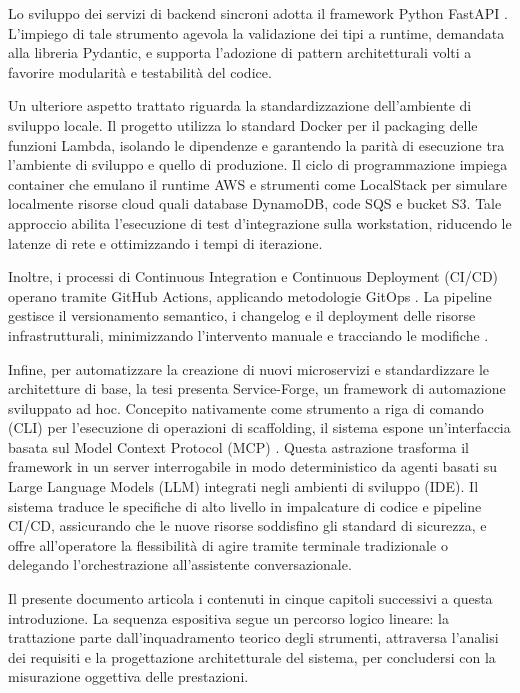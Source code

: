 Lo sviluppo dei servizi di backend sincroni adotta il framework Python FastAPI \cite{FastAPIDoc}. L'impiego di tale strumento agevola la validazione dei tipi a runtime, demandata alla libreria Pydantic, e supporta l'adozione di pattern architetturali volti a favorire modularità e testabilità del codice.

Un ulteriore aspetto trattato riguarda la standardizzazione dell'ambiente di sviluppo locale. Il progetto utilizza lo standard Docker \cite{DockerDoc} per il packaging delle funzioni Lambda, isolando le dipendenze e garantendo la parità di esecuzione tra l'ambiente di sviluppo e quello di produzione. Il ciclo di programmazione impiega container che emulano il runtime AWS e strumenti come LocalStack \cite{LocalStackPaper} per simulare localmente risorse cloud quali database DynamoDB, code SQS e bucket S3. Tale approccio abilita l'esecuzione di test d'integrazione sulla workstation, riducendo le latenze di rete e ottimizzando i tempi di iterazione.

Inoltre, i processi di Continuous Integration e Continuous Deployment (CI/CD) operano tramite GitHub Actions, applicando metodologie GitOps \cite{GitOps}. La pipeline gestisce il versionamento semantico, i changelog e il deployment delle risorse infrastrutturali, minimizzando l'intervento manuale e tracciando le modifiche \cite{AccelerateBook}.

Infine, per automatizzare la creazione di nuovi microservizi e standardizzare le architetture di base, la tesi presenta Service-Forge, un framework di automazione sviluppato ad hoc. Concepito nativamente come strumento a riga di comando (CLI) per l'esecuzione di operazioni di scaffolding, il sistema espone un'interfaccia basata sul Model Context Protocol (MCP) \cite{MCP}. Questa astrazione trasforma il framework in un server interrogabile in modo deterministico da agenti basati su Large Language Models (LLM) integrati negli ambienti di sviluppo (IDE). Il sistema traduce le specifiche di alto livello in impalcature di codice e pipeline CI/CD, assicurando che le nuove risorse soddisfino gli standard di sicurezza, e offre all'operatore la flessibilità di agire tramite terminale tradizionale o delegando l'orchestrazione all'assistente conversazionale.

Il presente documento articola i contenuti in cinque capitoli successivi a questa introduzione. La sequenza espositiva segue un percorso logico lineare: la trattazione parte dall'inquadramento teorico degli strumenti, attraversa l'analisi dei requisiti e la progettazione architetturale del sistema, per concludersi con la misurazione oggettiva delle prestazioni.

